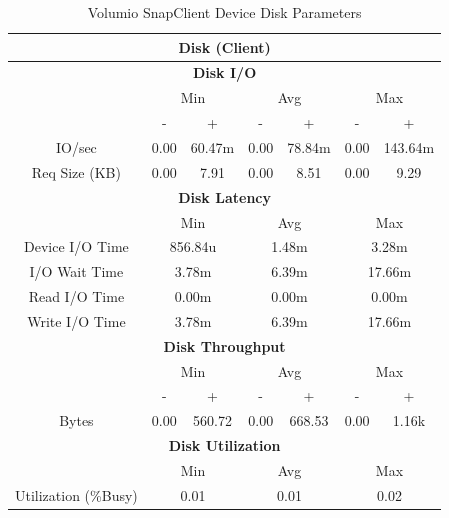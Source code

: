 \documentclass[11pt,a4paper,headinclude=false,footinclude=false]{scrreprt}
\begin{document}
\begin{table}[H]
\centering
    \begin{tabular}{||c|c|c|c|c|c|c||}
    \hline
    \multicolumn{7}{|c|}{\textbf{Disk (Client)}} \\
    \hline
    \multicolumn{7}{|c|}{\textbf{Disk I/O}} \\
    \hline\hline
      & \multicolumn{2}{|c|}{Min} & \multicolumn{2}{|c|}{Avg} & \multicolumn{2}{|c|}{Max} \\
    \hline
      & - & + & - & + & - & + \\
    \hline
    IO/sec & 0.00 & 60.47m & 0.00 & 78.84m & 0.00 & 143.64m \\
    \hline
    Req Size (KB) & 0.00 & 7.91 & 0.00 & 8.51 & 0.00 & 9.29 \\
    \hline\hline
    \multicolumn{7}{|c|}{\textbf{Disk Latency}} \\
    \hline\hline
      & \multicolumn{2}{|c|}{Min} & \multicolumn{2}{|c|}{Avg} & \multicolumn{2}{|c|}{Max} \\
    \hline
    Device I/O Time  & \multicolumn{2}{|c|}{856.84u} & \multicolumn{2}{|c|}{1.48m} & \multicolumn{2}{|c|}{3.28m} \\
    \hline
    I/O Wait Time  & \multicolumn{2}{|c|}{3.78m} & \multicolumn{2}{|c|}{6.39m} & \multicolumn{2}{|c|}{17.66m} \\
    \hline
    Read I/O Time  & \multicolumn{2}{|c|}{0.00m} & \multicolumn{2}{|c|}{0.00m} & \multicolumn{2}{|c|}{0.00m} \\
    \hline
    Write I/O Time  & \multicolumn{2}{|c|}{3.78m} & \multicolumn{2}{|c|}{6.39m} & \multicolumn{2}{|c|}{17.66m} \\
    \hline\hline
    \multicolumn{7}{|c|}{\textbf{Disk Throughput}} \\
    \hline\hline
      & \multicolumn{2}{|c|}{Min} & \multicolumn{2}{|c|}{Avg} & \multicolumn{2}{|c|}{Max} \\
    \hline
      & - & + & - & + & - & + \\
    \hline
    Bytes & 0.00 & 560.72 & 0.00 & 668.53 & 0.00 & 1.16k \\
    \hline\hline
    \multicolumn{7}{|c|}{\textbf{Disk Utilization}} \\
    \hline\hline
      & \multicolumn{2}{|c|}{Min} & \multicolumn{2}{|c|}{Avg} & \multicolumn{2}{|c|}{Max} \\
    \hline
    Utilization (\%Busy)  & \multicolumn{2}{|c|}{0.01} & \multicolumn{2}{|c|}{0.01} & \multicolumn{2}{|c|}{0.02} \\
    \hline\hline
    \end{tabular}
    \caption{Volumio SnapClient Device Disk Parameters}
    \label{VolumioclientDiskTab}
\end{table}
\end{document}
